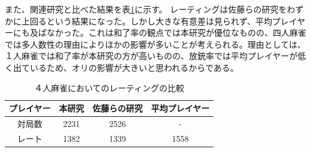 また、関連研究と比べた結果を表\ref{tb:rate2231}に示す。
レーティングは佐藤らの研究をわずかに上回るという結果になった。しかし大きな有意差は見られず、平均プレイヤーにも及ばなかった。これは和了率の観点では本研究が優位なものの、四人麻雀では多人数性の理由によりほかの影響が多いことが考えられる。理由としては、１人麻雀では和了率が本研究の方が高いものの、放銃率では平均プレイヤーが低く出ているため、オリの影響が大きいと思われるからである。

\begin{table}[h]
  \caption{４人麻雀においてのレーティングの比較}
  \label{tb:rate2231}
  \begin{center}
  \begin{tabular}{c|c|c|c}
    \hline
    プレイヤー   & 本研究 & 佐藤らの研究 & 平均プレイヤー\\\hline\hline
    対局数   & 2231 & 2526 & - \\\hline
    レート & 1382 & 1339 & 1558\\\hline
  \end{tabular}\end{center}
\end{table}





